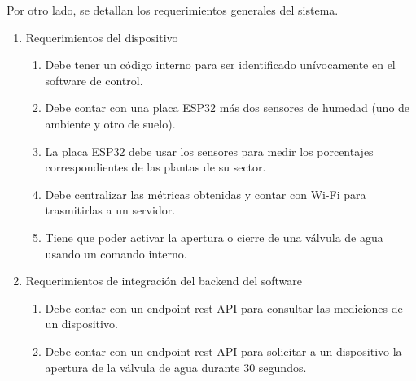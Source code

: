 Por otro lado, se detallan los requerimientos generales del sistema.
\begin{enumerate}
	\item Requerimientos del dispositivo
		\begin{enumerate}
			\item Debe tener un código interno para ser identificado unívocamente en el software de control.
			\item Debe contar con una placa ESP32 más dos sensores de humedad (uno de ambiente y otro de suelo).
			\item La placa ESP32 debe usar los sensores para medir los porcentajes correspondientes de las plantas de su sector. 
			\item Debe centralizar las métricas obtenidas y contar con Wi-Fi para trasmitirlas a un servidor. 
			\item Tiene que poder activar la apertura o cierre de una válvula de agua usando un comando interno.
		\end{enumerate}
	
	\item Requerimientos de integración del backend del software
		\begin{enumerate}
			\item Debe contar con un endpoint rest API para consultar las mediciones de un dispositivo.
			\item Debe contar con un endpoint rest API para solicitar a un dispositivo la apertura de la válvula de agua durante 30 segundos.
			\end{enumerate}


\end{enumerate}
